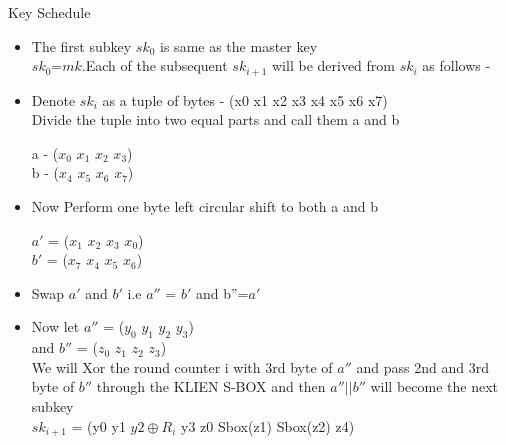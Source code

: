 \begin{frame}{Key Schedule}

\begin{itemize}
	
	\item The first subkey $sk_{0}$ is same as the master key \\
	$sk_{0}$=$mk$.Each of the subsequent $sk_{i+1}$ will be derived from $sk_{i}$ as follows - \\
	
	\item Denote $sk_{i}$ as a tuple of bytes - (x0 x1 x2 x3 x4 x5 x6 x7) \\
	Divide the tuple into two equal parts and call them a and b 
	
	a - ($ x_{0}$ $x_{1}$ $x_{2}$ $x_{3}$) \\
	b - ($x_{4}$ $x_{5}$ $x_{6}$ $x_{7}$) \\
	
	\item Now Perform one byte left circular shift to both a and b
	
	$a'$ = ($x_{1}$ $x_{2}$ $x_{3}$ $x_{0}$) \\
	$b'$  = ($x_{7}$ $x_{4}$ $x_{5}$ $x_{6}$) \\
\end{itemize}
\end{frame}
\begin{frame}
\begin{itemize}

	\item Swap $a'$ and $b'$  i.e $a''$ = $b'$  and b''=$a'$ \\
	
	\item Now let $a''$ = ($y_{0}$ $y_{1}$ $y_{2}$ $y_{3}$) \\
	and $b''$ = ($z_{0}$ $z_{1}$ $z_{2}$ $z_{3}$) \\
	
	We will Xor the round counter i with 3rd byte of $a''$ and pass 2nd and 3rd byte of $b''$ through the KLIEN S-BOX and then $a''$$||$$b''$ will become the next subkey \\
	$sk_{i+1}$ = (y0 y1 $ y2 \oplus R_i $ y3 z0 Sbox(z1) Sbox(z2) z4)\\
\end{itemize}
\end{frame}
